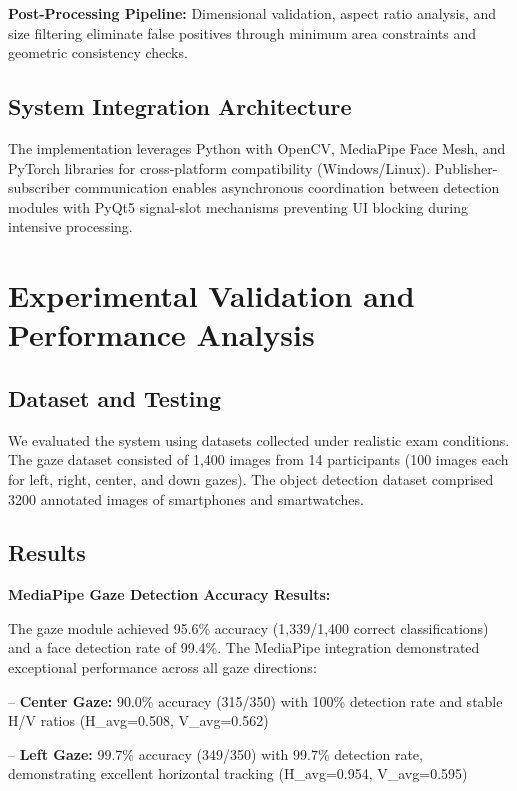\documentclass[conference]{IEEEtran}
\begin{document}
\textbf{Post-Processing Pipeline:} Dimensional validation, aspect ratio analysis, and 
size filtering eliminate false positives through minimum area constraints and geometric 
consistency checks.

\subsection{System Integration Architecture}

The implementation leverages Python with OpenCV, MediaPipe Face Mesh, and PyTorch 
libraries for cross-platform compatibility (Windows/Linux). Publisher-subscriber 
communication enables asynchronous coordination between detection modules with PyQt5 
signal-slot mechanisms preventing UI blocking during intensive processing.

\section{Experimental Validation and Performance Analysis}

\subsection{Dataset and Testing}
We evaluated the system using datasets collected under realistic exam conditions. 
The gaze dataset consisted of 1,400 images from 14 participants (100 images each 
for left, right, center, and down gazes). The object detection dataset comprised 
3200 annotated images of smartphones and smartwatches.

\subsection{Results}
\textbf{MediaPipe Gaze Detection Accuracy Results:}

The gaze module achieved 95.6\% accuracy (1,339/1,400 correct classifications) 
and a face detection rate of 99.4\%. The MediaPipe integration demonstrated 
exceptional performance across all gaze directions\cite{mediapipe2023docs,frontiersgaze2024,akinyelu2021}:

-- \textbf{Center Gaze:} 90.0\% accuracy (315/350) with 100\% detection rate and stable H/V ratios (H\_avg=0.508, V\_avg=0.562)

-- \textbf{Left Gaze:} 99.7\% accuracy (349/350) with 99.7\% detection rate, demonstrating excellent horizontal tracking (H\_avg=0.954, V\_avg=0.595)
\end{document}
